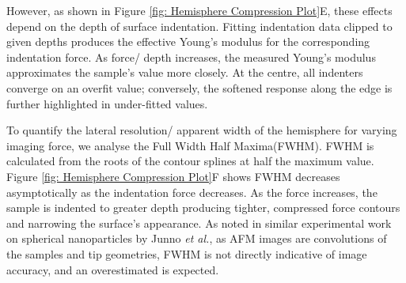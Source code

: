 However, as shown in Figure \ref{fig: Hemisphere Compression Plot}E, these effects depend on the depth of surface indentation. Fitting indentation data clipped to given depths produces the effective Young's modulus for the corresponding indentation force. As force/ depth increases, the measured Young's modulus approximates the sample's value more closely. At the centre, all indenters converge on an overfit value; conversely, the softened response along the edge is further highlighted in under-fitted values.

To quantify the lateral resolution/ apparent width of the hemisphere for varying imaging force, we analyse the Full Width Half Maxima(FWHM)\cite{sotres2010afm}. FWHM is calculated from the roots of the contour splines at half the maximum value. Figure \ref{fig: Hemisphere Compression Plot}F shows FWHM decreases asymptotically as the indentation force decreases. As the force increases, the sample is indented to greater depth producing tighter, compressed force contours and narrowing the surface's appearance. As noted in similar experimental work on spherical nanoparticles by Junno \textit{et al.}\cite{junno1995controlled}, as AFM images are convolutions of the samples and tip geometries, FWHM is not directly indicative of image accuracy, and an overestimated is expected. 

